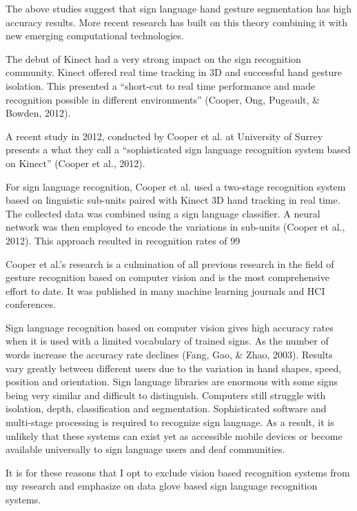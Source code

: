 The above studies suggest that sign language hand gesture segmentation has high accuracy results. More recent research has built on this theory combining it with new emerging computational technologies. 

The debut of Kinect had a very strong impact on the sign recognition community. Kinect offered real time tracking in 3D and successful hand gesture isolation. This presented a ``short-cut to real time performance and made recognition possible in different environments'' (Cooper, Ong, Pugeault, & Bowden, 2012).

A recent study in 2012, conducted by Cooper et al. at University of Surrey presents a what they call a ``sophisticated sign language recognition system based on Kinect'' (Cooper et al., 2012).

For sign language recognition, Cooper et al. used a two-stage recognition system based on linguistic sub-units paired with Kinect 3D hand tracking in real time. The collected data was combined using a sign language classifier. A neural network was then employed to encode the variations in sub-units (Cooper et al., 2012). This approach resulted in recognition rates of 99%

Cooper et al.’s research is a culmination of all previous research in the field of gesture recognition based on computer vision and is the most comprehensive effort to date. It was published in many machine learning journals and HCI conferences. 

Sign language recognition based on computer vision gives high accuracy rates when it is used with a limited vocabulary of trained signs. As the number of words increase the accuracy rate declines (Fang, Gao, & Zhao, 2003). Results vary greatly between different users due to the variation in hand shapes, speed, position and orientation. Sign language libraries are enormous with some signs being very similar and difficult to distinguish. Computers still struggle with isolation, depth, classification and segmentation. Sophisticated software and multi-stage processing is required to recognize sign language. As a result, it is unlikely that these systems can exist yet as accessible mobile devices or become available universally to sign language users and deaf communities. 

It is for these reasons that I opt to exclude vision based recognition systems from my research and emphasize on data glove based sign language recognition systems. 



